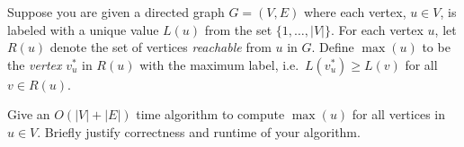 \documentclass[11pt]{article}
\begin{document}
    
    \newpage
    \begin{tcolorbox}[title={Problem 2 (Reachability, 35 pts)}] \setlength\parindent{1em} 
        Suppose you are given a directed graph $G=(V,E)$ where each vertex, $u\in V$, is labeled with a unique value $L(u)$ from the set $\{1,\ldots,|V|\}$. For each vertex $u$, let $R(u)$ denote the set of vertices \emph{reachable} from $u$ in $G$. Define $\max(u)$ to be the \emph{vertex} $v^*_u$ in $R(u)$ with the maximum label, i.e.~$L(v^*_u) \ge L(v)$ for all $v\in R(u)$.
        
        Give an $O(|V|+|E|)$ time algorithm to compute $\max(u)$ for all vertices in $u\in V$. Briefly justify correctness and runtime of your algorithm.
    \end{tcolorbox}
    
\end{document}
